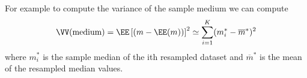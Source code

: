 For example to compute the variance of the sample medium we can compute
\begin{equation*}
    \VV (\text{medium}) = \EE \left[ (m - \EE(m)) \right]^2 \simeq \sum_{i=1}^{K} (m_i^{\ast} - \overline{m}^{\ast})^2
\end{equation*}
where $m_i^{\ast}$ is the sample median of the ith resampled dataset and $\overline{m}^{\ast}$ is the mean of the resampled median values.